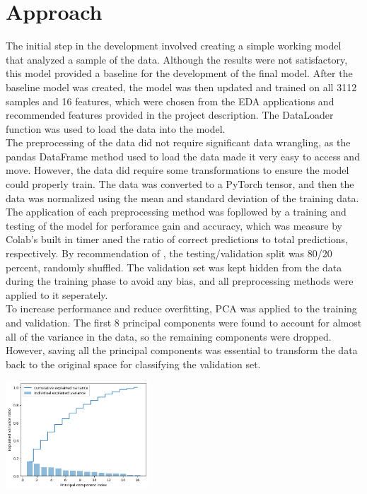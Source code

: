 \documentclass{article}[12pt]
\begin{document}
\section*{Approach}

The initial step in the development involved creating a simple working model that analyzed a sample of the data. Although the results were not satisfactory, this model provided a baseline for the development of the final model. After the baseline model was created, the model was then updated and trained on all 3112 samples and 16 features, which were chosen from the EDA applications and recommended features provided in the project description. The DataLoader function was used to load the data into the model.\\

\indent
The preprocessing of the data did not require significant data wrangling, as the pandas DataFrame method used to load the data made it very easy to access and move. However, the data did require some transformations to ensure the model could properly train. The data was converted to a PyTorch tensor, and then the data was normalized using the mean and standard deviation of the training data. The application of each preprocessing method was fopllowed by a training and testing of the model for perforamce gain and accuracy, which was measure by Colab's built in timer aned the ratio of correct predictions to total predictions, respectively. By recommendation of \cite{Validation_Medium}, the testing/validation split was 80/20 percent, randomly shuffled. The validation set was kept hidden from the data during the training phase to avoid any bias, and all preprocessing methods were applied to it seperately.\\
\indent
To increase performance and reduce overfitting, PCA was applied to the training and validation\cite{PCA_Medium}. The first 8 principal components were found to account for almost all of the variance in the data, so the remaining components were dropped. However, saving all the principal components was essential to transform the data back to the original space for classifying the validation set.\\

\begin{center}
    \includegraphics[width=0.4\textwidth]{PCA.png}
\end{center}
\end{document}

